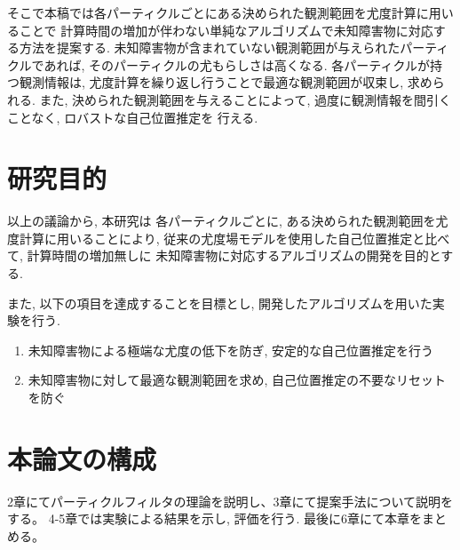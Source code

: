 そこで本稿では各パーティクルごとにある決められた観測範囲を尤度計算に用いることで
計算時間の増加が伴わない単純なアルゴリズムで未知障害物に対応する方法を提案する. 
未知障害物が含まれていない観測範囲が与えられたパーティクルであれば, 
そのパーティクルの尤もらしさは高くなる. 
各パーティクルが持つ観測情報は, 尤度計算を繰り返し行うことで最適な観測範囲が収束し, 求められる. 
また, 決められた観測範囲を与えることによって, 過度に観測情報を間引くことなく, ロバストな自己位置推定を
行える. 

\section{研究目的}
以上の議論から, 本研究は
各パーティクルごとに, ある決められた観測範囲を尤度計算に用いることにより, 
従来の尤度場モデルを使用した自己位置推定と比べて, 計算時間の増加無しに
未知障害物に対応するアルゴリズムの開発を目的とする. 

また, 以下の項目を達成することを目標とし, 開発したアルゴリズムを用いた実験を行う. 

\begin{enumerate}
  \item 未知障害物による極端な尤度の低下を防ぎ, 安定的な自己位置推定を行う
  \item 未知障害物に対して最適な観測範囲を求め, 自己位置推定の不要なリセットを防ぐ
\end{enumerate}

\section{本論文の構成}
2章にてパーティクルフィルタの理論を説明し、3章にて提案手法について説明をする。
4-5章では実験による結果を示し, 評価を行う. 最後に6章にて本章をまとめる。

